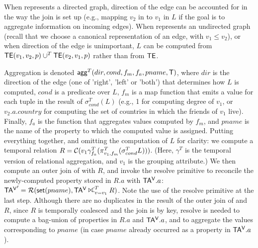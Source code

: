 When \tve represents a directed graph, direction of the edge can be
accounted for in the way the join is set up (e.g., mapping $v_2$ in
\te to $v_1$ in $L$ if the goal is to aggregate information on
incoming edges).  When \tve represents an undirected graph (recall
that we choose a canonical representation of an edge, with $v_1 \leq
v_2$), or when direction of the edge is unimportant, $L$ can be
computed from $\textsf{TE}(v_1,v_2,p) \cup^T \textsf{TE}(v_2,v_1,p)$ rather than from
$\textsf{TE}$.

Aggregation is denoted $\textsf{agg}^T(dir,cond,f_m,f_a,pname,\mathsf{T})$,
where $dir$ is the direction of the edge (one of 'right', 'left' or
'both') that determines how $L$ is computed, $cond$ is a predicate
over $L$, $f_m$ is a map function that emits a value for each tuple in
the result of $\sigma^T_{cond}(L)$ (e.g., 1 for computing degree of
$v_1$, or $v_2.a.country$ for computing the set of countries in which
the friends of $v_1$ live).  Finally, $f_a$ is the function that
aggregates values computed by $f_m$, and $pname$ is the name of the
property to which the computed value is assigned.  Putting everything
together, and omitting the computation of $L$ for clarity: we compute
a temporal relation $R = \mathcal{C}(v_1 \gamma^T_{f_a} (\pi^T_{v_1,f_m}
  (\sigma^T_{cond} L)))$. (Here, $\gamma^T$ is the temporal version of
relational aggregation, and $v_1$ is the grouping attribute.)  We then
compute an outer join of \tav with $R$, and invoke the resolve
primitive to reconcile the newly-computed property stored in $R.a$
with $\mathsf{TA^{V}}.a$: $\tav' = \resolve{\insql{set}(pname)}{\tav
  \rightouterjoin^T_{v=v_1} R}$. Note the use of the resolve primitive
at the last step.  Although there are no duplicates in the result of
the outer join of \tav and $R$, since $R$ is temporally coalesced and
the join is by key, resolve is needed to compute a bag-union of
properties in $R.a$ and $\mathsf{TA^{V}}.a$, and to aggregate the values
corresponding to $pname$ (in case $pname$ already occurred as a
property in $\mathsf{TA^{V}}.a$).


